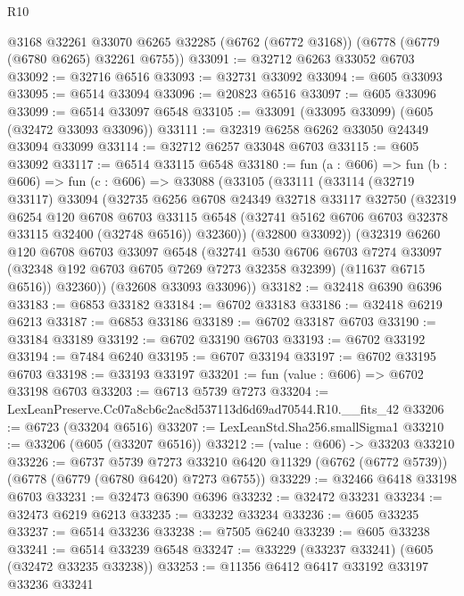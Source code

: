 \begin{lexlean}{R10}
\begin{coremodule}
    @3168
    @32261
    @33070
    @6265
    @32285
    (@6762 (@6772 @3168))
    (@6778 (@6779 (@6780 @6265) @32261 @6755))
@33091 := @32712 @6263 @33052 @6703
@33092 := @32716 @6516
@33093 := @32731 @33092
@33094 := @605 @33093
@33095 := @6514 @33094
@33096 := @20823 @6516
@33097 := @605 @33096
@33099 := @6514 @33097 @6548
@33105 := @33091 (@33095 @33099) (@605 (@32472 @33093 @33096))
@33111 := @32319 @6258 @6262 @33050 @24349 @33094 @33099
@33114 := @32712 @6257 @33048 @6703
@33115 := @605 @33092
@33117 := @6514 @33115 @6548
@33180 := fun (a : @606) =>
  fun (b : @606) =>
  fun (c : @606) =>
  @33088
    (@33105
      (@33111
        (@33114
          (@32719 @33117)
          @33094
          (@32735
            @6256
            @6708
            @24349
            @32718
            @33117
            @32750
            (@32319
              @6254
              @120
              @6708
              @6703
              @33115
              @6548
              (@32741 @5162 @6706 @6703 @32378 @33115 @32400 (@32748 @6516))
              @32360))
          (@32800 @33092))
        (@32319
          @6260
          @120
          @6708
          @6703
          @33097
          @6548
          (@32741
            @530
            @6706
            @6703
            @7274
            @33097
            (@32348 @192 @6703 @6705 @7269 @7273 @32358 @32399)
            (@11637 @6715 @6516))
          @32360))
      (@32608 @33093 @33096))
@33182 := @32418 @6390 @6396
@33183 := @6853 @33182
@33184 := @6702 @33183
@33186 := @32418 @6219 @6213
@33187 := @6853 @33186
@33189 := @6702 @33187 @6703
@33190 := @33184 @33189
@33192 := @6702 @33190 @6703
@33193 := @6702 @33192
@33194 := @7484 @6240
@33195 := @6707 @33194
@33197 := @6702 @33195 @6703
@33198 := @33193 @33197
@33201 := fun (value : @606) => @6702 @33198 @6703
@33203 := @6713 @5739 @7273
@33204 := LexLeanPreserve.Cc07a8cb6c2ac8d537113d6d69ad70544.R10.__fits_42
@33206 := @6723 (@33204 @6516)
@33207 := LexLeanStd.Sha256.smallSigma1
@33210 := @33206 (@605 (@33207 @6516))
@33212 := (value : @606) -> @33203 @33210
@33226 := @6737
    @5739
    @7273
    @33210
    @6420
    @11329
    (@6762 (@6772 @5739))
    (@6778 (@6779 (@6780 @6420) @7273 @6755))
@33229 := @32466 @6418 @33198 @6703
@33231 := @32473 @6390 @6396
@33232 := @32472 @33231
@33234 := @32473 @6219 @6213
@33235 := @33232 @33234
@33236 := @605 @33235
@33237 := @6514 @33236
@33238 := @7505 @6240
@33239 := @605 @33238
@33241 := @6514 @33239 @6548
@33247 := @33229 (@33237 @33241) (@605 (@32472 @33235 @33238))
@33253 := @11356 @6412 @6417 @33192 @33197 @33236 @33241

\end{coremodule}
\end{lexlean}
